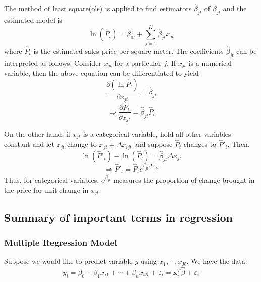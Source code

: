 \documentclass[12pt]{article}
\begin{document}
The method of least square(\acrshort{ols}) is applied to find estimators $\hat \beta_{jt}$ of $\beta_{jt}$ and the estimated model is
$$\ln (\hat P_{t})=\hat \beta_{0t}+\sum_{j=1} ^{K} \hat \beta_{jt}x_{jt}$$
where $\hat P_{t}$ is the estimated sales price per square meter.
The coefficients $\hat \beta_{jt}$ can be interpreted as follows. Consider $x_{jt}$ for a particular $j$. If $x_{jt}$ is a numerical variable, then the above equation can be differentiated to yield 
$$\frac{\partial (\ln \hat P_{t})}{\partial x_{jt}}=\hat \beta_{jt}$$
$$\Rightarrow \frac{\partial \hat P_{t}}{\partial x_{jt}}=\hat \beta_{jt} \hat P_{t}$$

On the other hand, if $x_{jt}$ is a categorical variable, hold all other variables constant and let $x_{jt}$ change to $x_{jt}+\Delta x_{ijt}$ and suppose $\hat P_t$ changes to $\hat P'_t$. Then, 
$$\ln(\hat P'_t)-\ln(\hat P_t)=\hat \beta_{jt}\Delta x_{jt}$$
$$\Rightarrow \hat P'_t=\hat P_t e^{\beta_{jt}\Delta x_{jt}}$$
Thus, for categorical variables, $e^{\hat \beta_{jt}}$ measures the proportion of change brought in the price for unit change in $x_{jt}$.

\subsection{Summary of important terms in regression}
\subsubsection{Multiple Regression Model}
Suppose we would like to predict variable $y$ using $x_1, \cdots, x_K$. We have the data:
$$y_i=\beta_0+\beta_1 x_{i1}+\cdots +\beta_n x_{iK}+\varepsilon_i={\textbf{x}_i^T\vec \beta}+\varepsilon_i$$
\end{document}
